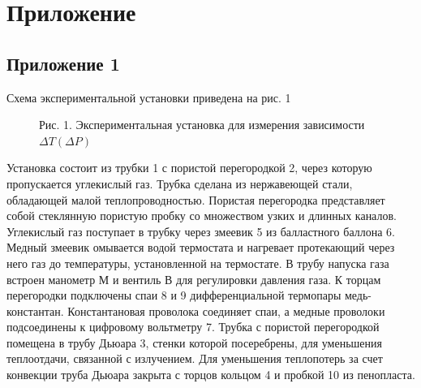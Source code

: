 \section{Приложение} \label{Приложение}

\subsection{Приложение 1} \label{Приложение 1}
Схема экспериментальной установки приведена на рис. 1
\begin{figure}[ht]
    \begin{center}       
        Рис. 1. Экспериментальная установка для измерения зависимости $\Delta T(\Delta P)$
    \end{center}
\end{figure}

Установка состоит из трубки 1 с пористой перегородкой 2, через которую пропускается углекислый газ. Трубка сделана из нержавеющей стали, обладающей малой теплопроводностью. Пористая перегородка представляет собой стеклянную пористую пробку со множеством узких и длинных каналов. Углекислый газ поступает в трубку через змеевик 5 из балластного баллона 6. Медный змеевик омывается водой термостата и нагревает протекающий через него газ до температуры, установленной на термостате. В трубу напуска газа встроен манометр М и вентиль В для регулировки давления газа. К торцам перегородки подключены спаи 8 и 9 дифференциальной термопары медь-константан. Константановая проволока соединяет спаи, а медные проволоки подсоединены к цифровому вольтметру 7. Трубка с пористой перегородкой помещена в трубу Дьюара 3, стенки которой посеребрены, для уменьшения теплоотдачи, связанной с излучением. Для уменьшения теплопотерь за счет конвекции труба Дьюара закрыта с торцов кольцом 4 и пробкой 10 из пенопласта.

